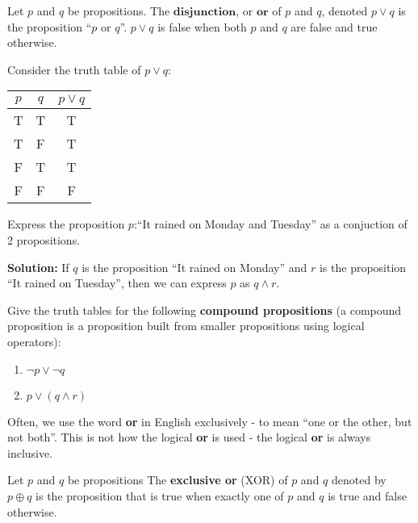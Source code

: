 \begin{defn}
  Let $p$ and $q$ be propositions. The $\textbf{disjunction}$, or
  $\textbf{or}$ of $p$ and $q$, denoted $p\vee q$ is the proposition ``$p$
  or $q$''. $p\vee q$ is false when both $p$ and $q$ are false and true
  otherwise.
\end{defn}

Consider the truth table of $p\vee q$:
\begin{table}[h] \centering
  \begin{tabular}{|c|c|c|}\hline
    $p$ & $q$ & $p\vee q$ \\\hline
    T & T & T \\\hline
    T & F & T \\\hline
    F & T & T \\\hline
    F & F & F \\\hline
  \end{tabular}
\end{table}

\begin{example}
  Express the proposition $p$:``It rained on Monday and Tuesday'' as a
  conjuction of 2 propositions.

  \textbf{Solution:} If $q$ is the proposition ``It rained on
  Monday'' and $r$ is the proposition ``It rained on Tuesday'', then we can
  express $p$ as $q\wedge r$.
\end{example}

\begin{exercise}
  Give the truth tables for the following \textbf{compound propositions}
  (a compound proposition is a proposition built from smaller propositions
  using logical operators):
  \begin{enumerate}
  \item $\neg p\vee \neg q$
  \item $p \vee (q \wedge r)$
  \end{enumerate}
\end{exercise}

Often, we use the word \textbf{or} in English exclusively - to mean ``one or the other, but not both''. This is not how the logical \textbf{or} is used - the logical \textbf{or} is always inclusive.

\begin{defn}
  Let $p$ and $q$ be propositions The \textbf{exclusive or} (XOR) of $p$
  and $q$ denoted by $p\oplus q$ is the proposition that is true when
  exactly one of $p$ and $q$ is true and false otherwise.
\end{defn}

